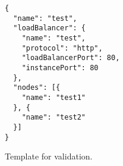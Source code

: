 \begin{figure}
  \begin{center}
    \begin{verbatim}
{
  "name": "test",
  "loadBalancer": {
    "name": "test",
    "protocol": "http",
    "loadBalancerPort": 80,
    "instancePort": 80
  },
  "nodes": [{
    "name": "test1"
  }, {
    "name": "test2"
  }]
}
    \end{verbatim}
  \end{center}
  \caption{Template for validation.}
  \label{list:validation-threenodes}
\end{figure}

